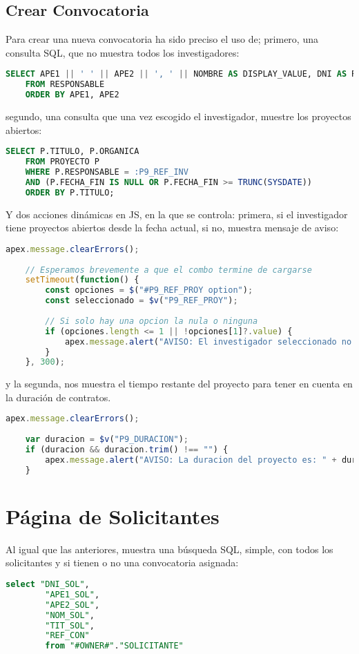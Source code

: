 \subsection{Crear Convocatoria}
Para crear una nueva convocatoria ha sido preciso el uso de; 
primero, una consulta \acrshort{SQL}, que no muestra todos los investigadores:
\begin{lstlisting}[language=SQL, caption={Presenta de todos las Investigadores}]
	SELECT APE1 || ' ' || APE2 || ', ' || NOMBRE AS DISPLAY_VALUE, DNI AS RETURN_VALUE
	FROM RESPONSABLE
	ORDER BY APE1, APE2
\end{lstlisting}
segundo, una consulta que una vez escogido el investigador, muestre los proyectos abiertos:
\begin{lstlisting}[language=SQL, caption={Presenta informe proyectos abiertos para el investigador seleccionado}]
	SELECT P.TITULO, P.ORGANICA
	FROM PROYECTO P
	WHERE P.RESPONSABLE = :P9_REF_INV
	AND (P.FECHA_FIN IS NULL OR P.FECHA_FIN >= TRUNC(SYSDATE))
	ORDER BY P.TITULO;
\end{lstlisting}
Y dos acciones dinámicas en \acrshort{JS}, en la que se controla: 
primera, si el investigador tiene proyectos abiertos desde la fecha actual, si no, muestra mensaje de aviso:
\begin{lstlisting}[language=JavaScript, caption={Control y aviso de proyecto abiertos de investigador seleccionado}]
	apex.message.clearErrors();
	
	// Esperamos brevemente a que el combo termine de cargarse
	setTimeout(function() {
		const opciones = $("#P9_REF_PROY option");
		const seleccionado = $v("P9_REF_PROY");
		
		// Si solo hay una opcion la nula o ninguna
		if (opciones.length <= 1 || !opciones[1]?.value) {
			apex.message.alert("AVISO: El investigador seleccionado no tiene proyectos abiertos.");
		}
	}, 300);
\end{lstlisting}
y la segunda, nos muestra el tiempo restante del proyecto para tener en cuenta en la duración de contratos.
\begin{lstlisting}[language=JavaScript, caption={Informa de la duración restante del proyecto elegido}]
	apex.message.clearErrors();
	
	var duracion = $v("P9_DURACION");
	if (duracion && duracion.trim() !== "") {
		apex.message.alert("AVISO: La duracion del proyecto es: " + duracion);
	}
\end{lstlisting}

\section{Página de Solicitantes}
Al igual que las anteriores, muestra una búsqueda \acrshort{SQL}, simple, con todos los solicitantes y si tienen o no una convocatoria asignada:
\begin{lstlisting}[language=SQL, caption={Presenta informe de solicitantes}]
		select "DNI_SOL", 
		"APE1_SOL",
		"APE2_SOL",
		"NOM_SOL",
		"TIT_SOL",
		"REF_CON"
		from "#OWNER#"."SOLICITANTE" 
\end{lstlisting}
